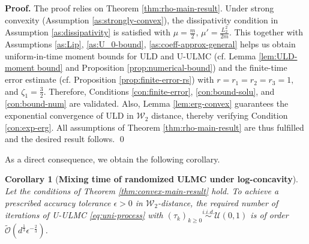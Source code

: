 \documentclass[12pt]{article}
\numberwithin{equation}{section}
\renewenvironment{proof}%
  {\begin{trivlist}%
   \item[]\ignorespaces}%
  {\qed\end{trivlist}}
\newtheorem{cor}{Corollary}[section]
\begin{document}
\begin{proof}
\textbf{Proof.}
The proof relies on Theorem \ref{thm:rho-main-result}.
Under strong convexity (Assumption \ref{as:strongly-convex}), the dissipativity condition in Assumption \ref{as:dissipativity} is satisfied with 
\(
    \mu=\tfrac{m}{2},\, \mu'=\tfrac{L_2^2}{2m}.
\)
%
This together with Assumptions \ref{as:Lip}, \ref{as:U_0-bound}, \ref{as:coeff-approx-general} helps us obtain uniform-in-time moment bounds for ULD and U-ULMC (cf. Lemma \ref{lem:ULD-moment bound} and Proposition \ref{prop:numerical-bound}) and  the finite-time error estimate (cf. Proposition \ref{prop:finite-error-rs}) with
$
r=r_1=r_2=r_3=1,
$ 
and
$
\zeta_1=\frac32
$. Therefore, Conditions \ref{con:finite-error}, \ref{con:bound-solu}, and \ref{con:bound-num} are validated.
%
Also, Lemma \ref{lem:erg-convex} guarantees the exponential convergence of ULD in  $\mathcal{W}_2$ distance, thereby verifying Condition \ref{con:exp-erg}.
%
All assumptions of Theorem \ref{thm:rho-main-result} are thus fulfilled and the desired result follows.
\end{proof}

As a direct consequence, we obtain the following corollary.



\begin{cor} [\textbf{Mixing time of randomized ULMC under log-concavity}]\label{prop:mixing_time-convex}
Let the conditions of Theorem \ref{thm:convex-main-result} hold. 
To achieve a prescribed accuracy tolerance \(\epsilon>0\) in \(\mathcal W_2\)-distance, the required number of iterations of U-ULMC \eqref{eq:uni-process} with $(\tau_k)_{k\ge 0}\overset{i.i.d.}{\sim}\mathcal U(0,1)$  is of order $\widetilde{\mathcal{O}}(d^{\frac{1}{3}}\epsilon^{-\frac{2}{3}})$.
\end{cor}
\end{document}
